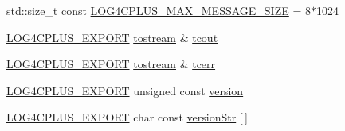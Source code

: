 \begin{DoxyCompactItemize}
\item 
std\-::size\-\_\-t const \hyperlink{namespacelog4cplus_abc1ea0aa55de46cd49a9d952ba501a4b}{L\-O\-G4\-C\-P\-L\-U\-S\-\_\-\-M\-A\-X\-\_\-\-M\-E\-S\-S\-A\-G\-E\-\_\-\-S\-I\-Z\-E} = 8$\ast$1024
\item 
\hyperlink{config_8hxx_ab13cb1a5317c245ee2ef4f2bfe0cfb2d}{L\-O\-G4\-C\-P\-L\-U\-S\-\_\-\-E\-X\-P\-O\-R\-T} \hyperlink{namespacelog4cplus_aef9e0c9a1adafed82c39fdef478716e1}{tostream} \& \hyperlink{namespacelog4cplus_a8705d2fccaec75d0902c2cf0eb710ae8}{tcout}
\item 
\hyperlink{config_8hxx_ab13cb1a5317c245ee2ef4f2bfe0cfb2d}{L\-O\-G4\-C\-P\-L\-U\-S\-\_\-\-E\-X\-P\-O\-R\-T} \hyperlink{namespacelog4cplus_aef9e0c9a1adafed82c39fdef478716e1}{tostream} \& \hyperlink{namespacelog4cplus_a2ea95cedc8798f6db66c7c0c0a05fb5b}{tcerr}
\item 
\hyperlink{config_8hxx_ab13cb1a5317c245ee2ef4f2bfe0cfb2d}{L\-O\-G4\-C\-P\-L\-U\-S\-\_\-\-E\-X\-P\-O\-R\-T} unsigned const \hyperlink{namespacelog4cplus_ab24ccab21946beedb7469136999061f7}{version}
\item 
\hyperlink{config_8hxx_ab13cb1a5317c245ee2ef4f2bfe0cfb2d}{L\-O\-G4\-C\-P\-L\-U\-S\-\_\-\-E\-X\-P\-O\-R\-T} char const \hyperlink{namespacelog4cplus_aace8d70b258163ebbb3a5a1481a68a66}{version\-Str} \mbox{[}$\,$\mbox{]}
\end{DoxyCompactItemize}



